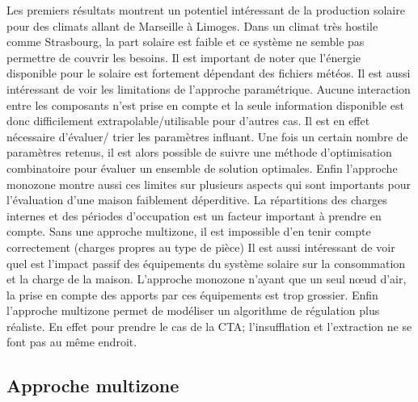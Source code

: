Les premiers résultats montrent un potentiel intéressant de la production solaire pour 
des climats allant de Marseille à Limoges. Dans un climat très hostile comme 
Strasbourg, la part solaire est faible et ce système ne semble pas permettre de couvrir
les besoins. Il est important de noter que l’énergie disponible pour le solaire est 
fortement dépendant des fichiers météos.
Il est aussi intéressant de voir les limitations de l’approche paramétrique. Aucune
interaction entre les composants n’est prise en compte et la seule information disponible
est donc difficilement extrapolable/utilisable pour d’autres cas. Il est en effet nécessaire
d’évaluer/ trier les paramètres influant. Une fois un certain nombre de paramètres retenus,
il est alors possible de suivre une méthode d’optimisation combinatoire pour évaluer 
un ensemble de solution optimales.
Enfin l’approche monozone montre aussi ces limites sur plusieurs aspects qui sont importants
pour l’évaluation d’une maison faiblement déperditive. La répartitions des charges internes
et des périodes d’occupation est un facteur important à prendre en compte. Sans une approche
multizone, il est impossible d’en tenir compte correctement (charges propres au type de pièce)
Il est aussi intéressant de voir quel est l’impact passif des équipements du système solaire sur la 
consommation et la charge de la maison. L’approche monozone n’ayant que un seul nœud
d’air, la prise en compte des apports par ces équipements est trop grossier.
Enfin l’approche multizone permet de modéliser un algorithme de régulation plus réaliste.
En effet pour prendre le cas de la CTA; l’insufflation et l’extraction ne se font pas au même endroit.


\subsection{Approche multizone} %
\label{sub:approche_multizone}




